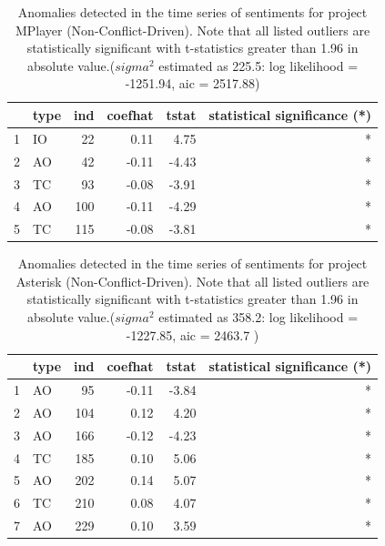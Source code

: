 \documentclass[12pt,letterpaper]{gthesis2}  %
\begin{document}
\begin{table}
\centering
\caption{Anomalies detected in the time series of sentiments for project MPlayer (Non-Conflict-Driven). Note that all listed outliers are statistically significant with t-statistics greater than 1.96 in absolute value.($sigma^2$ estimated as 225.5:  log likelihood = -1251.94,  aic = 2517.88)}
\begin{tabular}{rlrrrr}
  \hline
 & type & ind & coefhat & tstat & statistical significance (*)\\ 
  \hline
1 & IO &  22 & 0.11 & 4.75 & * \\ 
  2 & AO &  42 & -0.11 & -4.43 & * \\ 
  3 & TC &  93 & -0.08 & -3.91  & *\\ 
  4 & AO & 100 & -0.11 & -4.29 & * \\ 
  5 & TC & 115 & -0.08 & -3.81  & *\\ 
   \hline
\end{tabular}
\end{table}


\begin{table}
\centering
\caption{Anomalies detected in the time series of sentiments for project Asterisk (Non-Conflict-Driven). Note that all listed outliers are statistically significant with t-statistics greater than 1.96 in absolute value.($sigma^2$ estimated as 358.2:  log likelihood = -1227.85,  aic = 2463.7
  )}
\begin{tabular}{rlrrrr}
  \hline
 & type & ind & coefhat & tstat & statistical significance (*)\\ 
  \hline
1 & AO &  95 & -0.11 & -3.84 & * \\ 
  2 & AO & 104 & 0.12 & 4.20  & *\\ 
  3 & AO & 166 & -0.12 & -4.23 & * \\ 
  4 & TC & 185 & 0.10 & 5.06  & *\\ 
  5 & AO & 202 & 0.14 & 5.07  & *\\ 
  6 & TC & 210 & 0.08 & 4.07  & *\\ 
  7 & AO & 229 & 0.10 & 3.59  & *\\ 
   \hline
\end{tabular}
\end{table}

%
\end{document}
